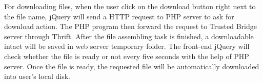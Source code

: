 For downloading files, when the user click on the download button right next to the file name, jQuery will send a HTTP request to PHP server to ask for download action. The PHP program then forward the request to Trusted Bridge server through Thrift. After the file assembling task is finished, a downloadable intact will be saved in web server temporary folder. The front-end jQuery will check whether the file is ready or not every five seconds with the help of PHP server. Once the file is ready, the requested file will be automatically downloaded into user's local disk.
